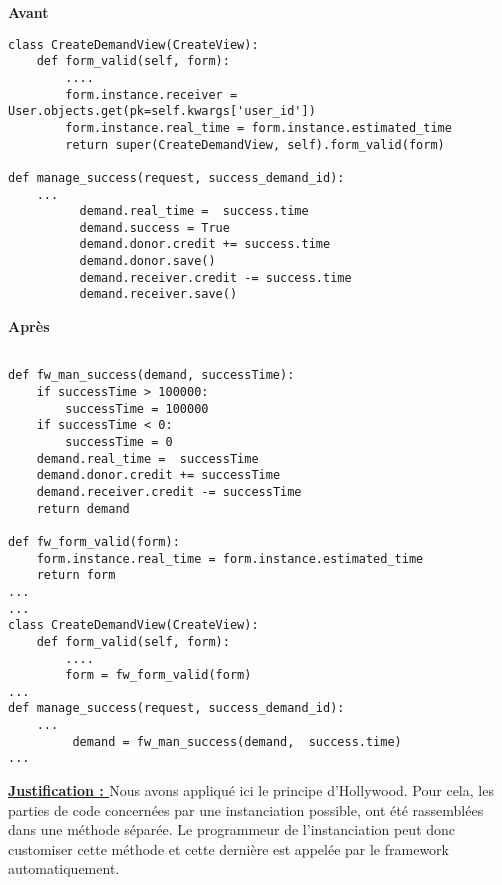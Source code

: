 \begin{minipage}{.5\textwidth}
\begin{center} \textbf{Avant}\end{center}
\begin{lstlisting}
class CreateDemandView(CreateView):
    def form_valid(self, form):
        ....
        form.instance.receiver = User.objects.get(pk=self.kwargs['user_id'])
        form.instance.real_time = form.instance.estimated_time
        return super(CreateDemandView, self).form_valid(form)

def manage_success(request, success_demand_id):
	...
          demand.real_time =  success.time
          demand.success = True
          demand.donor.credit += success.time
          demand.donor.save()
          demand.receiver.credit -= success.time
          demand.receiver.save()
\end{lstlisting} 
\end{minipage}
\hspace{0.3cm}
\begin{minipage}{.5\textwidth}
\begin{center} \textbf{Après}\end{center}
\begin{lstlisting}

def fw_man_success(demand, successTime):
    if successTime > 100000:
        successTime = 100000
    if successTime < 0:
        successTime = 0
    demand.real_time =  successTime
    demand.donor.credit += successTime
    demand.receiver.credit -= successTime  
    return demand

def fw_form_valid(form):
    form.instance.real_time = form.instance.estimated_time
    return form
...
...
class CreateDemandView(CreateView):
    def form_valid(self, form):
        ....
        form = fw_form_valid(form)
...
def manage_success(request, success_demand_id):
	...
         demand = fw_man_success(demand,  success.time)
...
\end{lstlisting} 
\end{minipage}

\textbf{\underline{Justification : }} Nous avons appliqué ici le principe d'Hollywood.  Pour cela,  les parties de code concernées par une instanciation possible,  ont été rassemblées dans une méthode séparée.  Le programmeur de l'instanciation peut donc customiser cette méthode et cette dernière est appelée par le framework automatiquement.

